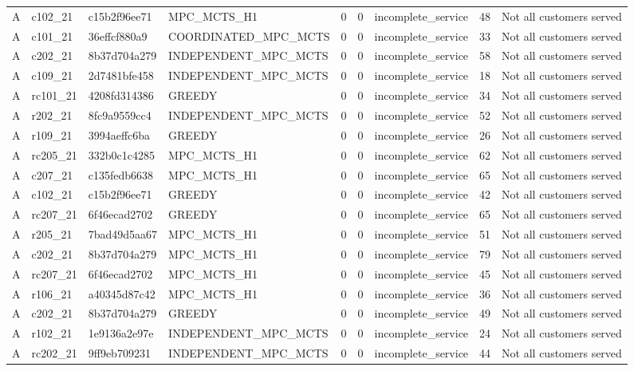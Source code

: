 \begin{table}
{\begin{tabular}{llllrrlrl}
A & c102\_21 & c15b2f96ee71 & MPC\_MCTS\_H1 & 0 & 0 & incomplete\_service & 48 & Not all customers served \\
A & c101\_21 & 36effcf880a9 & COORDINATED\_MPC\_MCTS & 0 & 0 & incomplete\_service & 33 & Not all customers served \\
A & c202\_21 & 8b37d704a279 & INDEPENDENT\_MPC\_MCTS & 0 & 0 & incomplete\_service & 58 & Not all customers served \\
A & c109\_21 & 2d7481bfe458 & INDEPENDENT\_MPC\_MCTS & 0 & 0 & incomplete\_service & 18 & Not all customers served \\
A & rc101\_21 & 4208fd314386 & GREEDY & 0 & 0 & incomplete\_service & 34 & Not all customers served \\
A & r202\_21 & 8fc9a9559cc4 & INDEPENDENT\_MPC\_MCTS & 0 & 0 & incomplete\_service & 52 & Not all customers served \\
A & r109\_21 & 3994aeffc6ba & GREEDY & 0 & 0 & incomplete\_service & 26 & Not all customers served \\
A & rc205\_21 & 332b0c1c4285 & MPC\_MCTS\_H1 & 0 & 0 & incomplete\_service & 62 & Not all customers served \\
A & c207\_21 & c135fedb6638 & MPC\_MCTS\_H1 & 0 & 0 & incomplete\_service & 65 & Not all customers served \\
A & c102\_21 & c15b2f96ee71 & GREEDY & 0 & 0 & incomplete\_service & 42 & Not all customers served \\
A & rc207\_21 & 6f46ecad2702 & GREEDY & 0 & 0 & incomplete\_service & 65 & Not all customers served \\
A & r205\_21 & 7bad49d5aa67 & MPC\_MCTS\_H1 & 0 & 0 & incomplete\_service & 51 & Not all customers served \\
A & c202\_21 & 8b37d704a279 & MPC\_MCTS\_H1 & 0 & 0 & incomplete\_service & 79 & Not all customers served \\
A & rc207\_21 & 6f46ecad2702 & MPC\_MCTS\_H1 & 0 & 0 & incomplete\_service & 45 & Not all customers served \\
A & r106\_21 & a40345d87c42 & MPC\_MCTS\_H1 & 0 & 0 & incomplete\_service & 36 & Not all customers served \\
A & c202\_21 & 8b37d704a279 & GREEDY & 0 & 0 & incomplete\_service & 49 & Not all customers served \\
A & r102\_21 & 1e9136a2e97e & INDEPENDENT\_MPC\_MCTS & 0 & 0 & incomplete\_service & 24 & Not all customers served \\
A & rc202\_21 & 9ff9eb709231 & INDEPENDENT\_MPC\_MCTS & 0 & 0 & incomplete\_service & 44 & Not all customers served \\

\end{tabular}}
\end{table}
